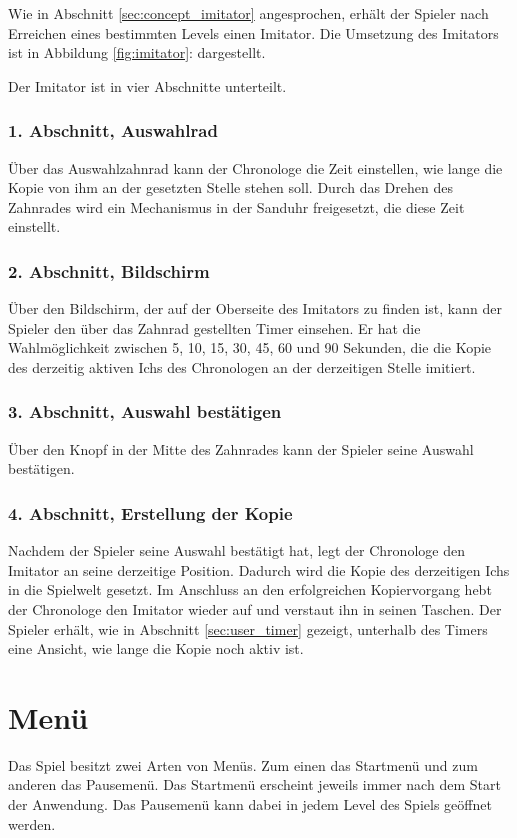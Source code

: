 Wie in Abschnitt \ref{sec:concept_imitator}  angesprochen, erhält der Spieler nach Erreichen eines bestimmten Levels einen Imitator. Die Umsetzung des Imitators ist in Abbildung \ref{fig:imitator}:  dargestellt.

Der Imitator ist in vier Abschnitte unterteilt.

\subsubsection{1. Abschnitt, Auswahlrad}
Über das Auswahlzahnrad kann der Chronologe die Zeit einstellen, wie lange die Kopie von ihm an der gesetzten Stelle stehen soll. Durch das Drehen des Zahnrades wird ein Mechanismus in der Sanduhr freigesetzt, die diese Zeit einstellt.

\subsubsection{2. Abschnitt, Bildschirm}
Über den Bildschirm, der auf der Oberseite des Imitators zu finden ist, kann der Spieler den über das Zahnrad gestellten Timer einsehen. Er hat die Wahlmöglichkeit zwischen 5, 10, 15, 30, 45, 60 und 90 Sekunden, die die Kopie des derzeitig aktiven Ichs des Chronologen an der derzeitigen Stelle imitiert. 

\subsubsection{3. Abschnitt, Auswahl bestätigen}
Über den Knopf in der Mitte des Zahnrades kann der Spieler seine Auswahl bestätigen.

\subsubsection{4. Abschnitt, Erstellung der Kopie}
Nachdem der Spieler seine Auswahl bestätigt hat, legt der Chronologe den Imitator an seine derzeitige Position. Dadurch wird die Kopie des derzeitigen Ichs in die Spielwelt gesetzt. Im Anschluss an den erfolgreichen Kopiervorgang hebt der Chronologe den Imitator wieder auf und verstaut ihn in seinen Taschen. Der Spieler erhält, wie in Abschnitt \ref{sec:user_timer}  gezeigt, unterhalb des Timers eine Ansicht, wie lange die Kopie noch aktiv ist.

\section{Menü}
Das Spiel besitzt zwei Arten von Menüs. Zum einen das Startmenü und zum anderen das Pausemenü. Das Startmenü erscheint jeweils immer nach dem Start der Anwendung. Das Pausemenü kann dabei in jedem Level des Spiels geöffnet werden. 

